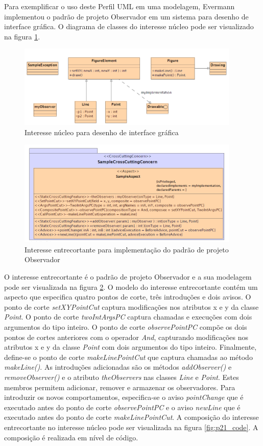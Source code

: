 Para exemplificar o uso deste Perfil UML em uma modelagem, Evermann implementou o padrão de projeto Observador \cite{Gamma:1995:DPE:186897} em um
sistema para desenho de interface gráfica. O diagrama de classes do interesse núcleo pode ser visualizado na figura \ref{fig:p21_base_model}. 

\begin{figure}
	\centering
	\includegraphics[width=400px]{img/p21_base_model.png}
	\caption{Interesse núcleo para desenho de interface gráfica}\label{fig:p21_base_model}
\end{figure}

\begin{figure}
	\centering
	\includegraphics[width=400px]{img/p21_extension_model.png}
	\caption{Interesse entrecortante para implementação do padrão de projeto Observador}\label{fig:p21_extension_model}
\end{figure}

O interesse entrecortante é o padrão de projeto Observador e a sua modelagem  pode ser visualizada na figura \ref{fig:p21_extension_model}. 
O modelo do interesse entrecortante contém um aspecto que especifica quatro pontos de corte, três introduções e dois avisos. O ponto de corte
\textit{setXYPointCut} captura modificações nos atributos x e y da classe \textit{Point}. O ponto de corte  \textit{twoIntArgsPC} captura chamadas e
execuções com dois argumentos do tipo inteiro. O ponto de corte \textit{observePointPC} compõe os dois pontos de cortes anteriores com o operador \textit{And},
capturando modificações nos atributos x e y da classe \textit{Point} com dois argumentos do tipo inteiro. Finalmente, define-se o ponto de corte 
\textit{makeLinePointCut} que captura chamadas ao método \textit{makeLine()}. As introduções adicionadas são os métodos \textit{addObserver()} e
\textit{removeObserver()} e o atributo \textit{theObservers} nas classes \textit{Line} e \textit{Point}. Estes membros permitem adicionar, remover e
armazenar os observadores. Para introduzir os novos comportamentos, especifica-se o aviso \textit{pointChange} que é executado antes do ponto de
corte \textit{observePointPC} e o aviso \textit{newLine} que é executado antes do ponto de corte \textit{makeLinePointCut}. A composição do interesse
entrecortante no interesse núcleo pode ser visualizada na figura \ref{fig:p21_code}. A composição é realizada em nível de código.

